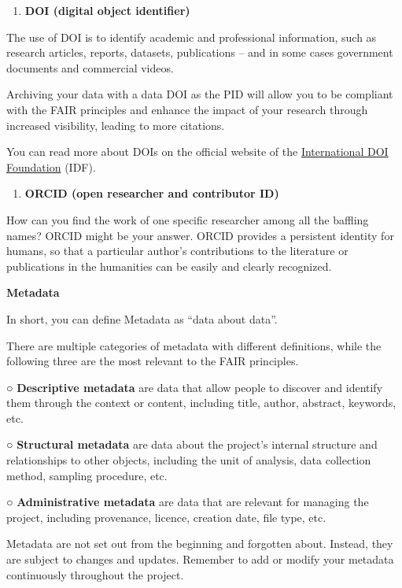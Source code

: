 \documentclass[
]{book}
\providecommand{\tightlist}{%
  \setlength{\itemsep}{0pt}\setlength{\parskip}{0pt}}
\begin{document}
\begin{enumerate}
\def\labelenumi{\arabic{enumi}.}
\tightlist
\item
  \textbf{DOI (digital object identifier)}
\end{enumerate}

The use of DOI is to identify academic and professional information, such as research articles, reports, datasets, publications -- and in some cases government documents and commercial videos.

Archiving your data with a data DOI as the PID will allow you to be compliant with the FAIR principles and enhance the impact of your research through increased visibility, leading to more citations.

You can read more about DOIs on the official website of the \href{https://www.doi.org/}{International DOI Foundation} (IDF).

\begin{enumerate}
\def\labelenumi{\arabic{enumi}.}
\setcounter{enumi}{1}
\tightlist
\item
  \textbf{ORCID (open researcher and contributor ID)}
\end{enumerate}

How can you find the work of one specific researcher among all the baffling names? ORCID might be your answer. ORCID provides a persistent identity for humans, so that a particular author's contributions to the literature or publications in the humanities can be easily and clearly recognized.

\textbf{Metadata}

In short, you can define Metadata as ``data about data''.

There are multiple categories of metadata with different definitions, while the following three are the most relevant to the FAIR principles.

○ \textbf{Descriptive metadata} are data that allow people to discover and identify them through the context or content, including title, author, abstract, keywords, etc.

○ \textbf{Structural metadata} are data about the project's internal structure and relationships to other objects, including the unit of analysis, data collection method, sampling procedure, etc.

○ \textbf{Administrative metadata} are data that are relevant for managing the project, including provenance, licence, creation date, file type, etc.

Metadata are not set out from the beginning and forgotten about. Instead, they are subject to changes and updates. Remember to add or modify your metadata continuously throughout the project.
\end{document}
